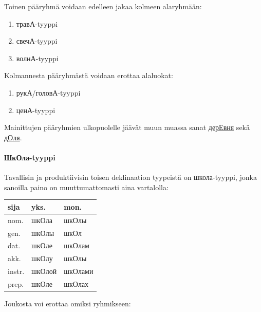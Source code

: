 \documentclass[]{scrartcl}
\providecommand{\tightlist}{%
  \setlength{\itemsep}{0pt}\setlength{\parskip}{0pt}}
\begin{document}
Toinen pääryhmä voidaan edelleen jakaa kolmeen alaryhmään:

\begin{enumerate}
\def\labelenumi{\alph{enumi})}
\tightlist
\item
  травА-tyyppi
\item
  свечА-tyyppi
\item
  волнА-tyyppi
\end{enumerate}

Kolmannesta pääryhmästä voidaan erottaa alaluokat:

\begin{enumerate}
\def\labelenumi{\alph{enumi})}
\tightlist
\item
  рукА/головА-tyyppi
\item
  ценА-tyyppi
\end{enumerate}

Mainittujen pääryhmien ulkopuolelle jäävät muun muassa sanat
\href{http://ru.wiktionary.org/wiki/деревня}{дерЕвня} sekä
\href{http://ru.wiktionary.org/wiki/доля}{дОля}.

\paragraph{ШкОла-tyyppi}\label{ux448ux43aux43eux43bux430-tyyppi}

Tavallisin ja produktiivisin toisen deklinaation tyypeistä on
школа-tyyppi, jonka sanoilla paino on muuttumattomasti aina vartalolla:

\begin{longtable}[c]{@{}lll@{}}
\toprule
sija & yks. & mon.\tabularnewline
\midrule
\endhead
nom. & шкОла & шкОлы\tabularnewline
gen. & шкОлы & шкОл\tabularnewline
dat. & шкОле & шкОлам\tabularnewline
akk. & шкОлу & шкОлы\tabularnewline
instr. & шкОлой & шкОлами\tabularnewline
prep. & шкОле & шкОлах\tabularnewline
\bottomrule
\end{longtable}

Joukosta voi erottaa omiksi ryhmikseen:
\end{document}
